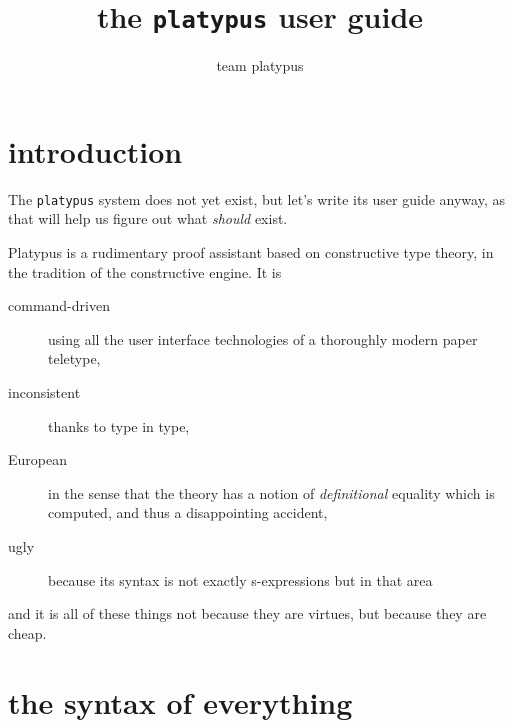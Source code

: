 \documentclass{article}
\begin{document}
\title{the {\tt platypus} user guide}
\author{team platypus}
\maketitle


\section{introduction}

The {\tt platypus} system does not yet exist, but let's write its user guide anyway,
as that will help us figure out what \emph{should} exist.

Platypus is a rudimentary proof assistant based on constructive type theory, in the
tradition of the constructive engine. It is
\begin{description}
\item[command-driven] using all the user interface technologies of a thoroughly
  modern paper teletype,
\item[inconsistent] thanks to type in type,
\item[European] in the sense that the theory has a notion of \emph{definitional}
  equality which is computed, and thus a disappointing accident,
\item[ugly] because its syntax is not exactly s-expressions but in that area
\end{description}
and it is all of these things not because they are virtues, but because they are
cheap.


\section{the syntax of everything}
\end{document}
